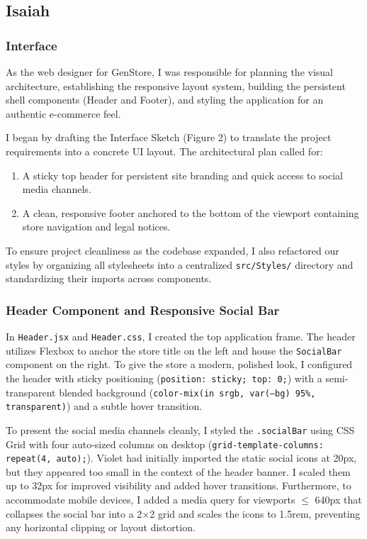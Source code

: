 \documentclass{article}[12pt]
\begin{document}
\subsection{Isaiah}
\subsubsection{Interface}
As the web designer for GenStore, I was responsible for planning the visual architecture, establishing the responsive layout system, building the persistent shell 
components (Header and Footer), and styling the application for an authentic e-commerce feel.

I began by drafting the Interface Sketch (Figure 2) to translate the project requirements into a concrete UI layout. The architectural plan called for:
\begin{enumerate}
    \item A sticky top header for persistent site branding and quick access to social media channels.
    \item A clean, responsive footer anchored to the bottom of the viewport containing store navigation and legal notices.
\end{enumerate}

To ensure project cleanliness as the codebase expanded, I also refactored our styles by organizing all stylesheets into a centralized 
\texttt{src/Styles/} directory and standardizing their imports across components.

\subsubsection{Header Component and Responsive Social Bar}
In \texttt{Header.jsx} and \texttt{Header.css}, I created the top application frame. The header utilizes Flexbox to anchor the store title on the 
left and house the \texttt{SocialBar} component on the right. To give the store a modern, polished look, I configured the header with sticky positioning 
(\texttt{position: sticky; top: 0;}) with a semi-transparent blended background (\texttt{color-mix(in srgb, var(--bg) 95\%, transparent)}) and a subtle hover transition.

To present the social media channels cleanly, I styled the \texttt{.socialBar} using CSS Grid with four auto-sized columns on desktop 
(\texttt{grid-template-columns: repeat(4, auto);}). Violet had initially imported the static social icons at 20px, but they appeared 
too small in the context of the header banner. I scaled them up to 32px for improved visibility and added hover transitions. Furthermore, 
to accommodate mobile devices, I added a media query for viewports $\le$ 640px that collapses the social bar into a 2$\times$2 grid and scales the icons to 1.5rem, 
preventing any horizontal clipping or layout distortion.
\end{document}
